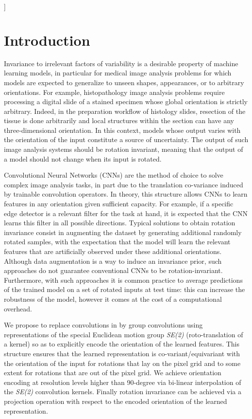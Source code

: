 \documentclass[twocolumn,final]{article}
\newcommand{\se}[1]{\textit{SE(#1)}}
\newcommand{\mset}[2]{}
\begin{document}
]


\section{Introduction}
\label{introduction}
Invariance to irrelevant factors of variability is a desirable property of machine learning models, in particular for medical image analysis problems for which models are expected to generalize to unseen shapes, appearances, or to arbitrary orientations.
For example, histopathology image analysis problems require processing a digital slide of a stained specimen whose global orientation is strictly arbitrary.
Indeed, in the preparation workflow of histology slides, resection of the tissue is done arbitrarily and local structures within the section can have any three-dimensional orientation.
In this context, models whose output varies with the orientation of the input constitute a source of uncertainty.
The output of such image analysis systems should be rotation invariant, meaning that the output of a model should not change when its input is rotated.


Convolutional Neural Networks (CNNs) are the method of choice to solve complex image analysis tasks, in part due to the translation co-variance induced by trainable \mset{R}{2} convolution operators.
In theory, this structure allows CNNs to learn features in any orientation given sufficient capacity.
For example, if a specific edge detector is a relevant filter for the task at hand, it is expected that the CNN learns this filter in all possible directions.
Typical solutions to obtain rotation invariance consist in augmenting the dataset by generating additional randomly rotated samples, with the expectation that the model will learn the relevant features that are artificially observed under these additional orientations.
Although data augmentation is a way to induce an invariance prior, such approaches do not guarantee conventional CNNs to be rotation-invariant.
Furthermore, with such approaches it is common practice to average predictions of the trained model on a set of rotated inputs at test time: this can increase the robustness of the model, however it comes at the cost of a computational overhead.

We propose to replace convolutions in \mset{R}{2} by group convolutions using representations of the special Euclidean motion group \se{2} (roto-translation of a kernel) so as to explicitly encode the orientation of the learned features.
This structure ensures that the learned representation is co-variant/equivariant with the orientation of the input for rotations that lay on the pixel grid and to some extent for rotations that are out of the pixel grid.
We achieve orientation encoding at resolution levels higher than 90-degree via bi-linear interpolation of the \se{2} convolution kernels.
Finally rotation invariance can be achieved via a projection operation with respect to the encoded orientation of the learned representation.
\end{document}
